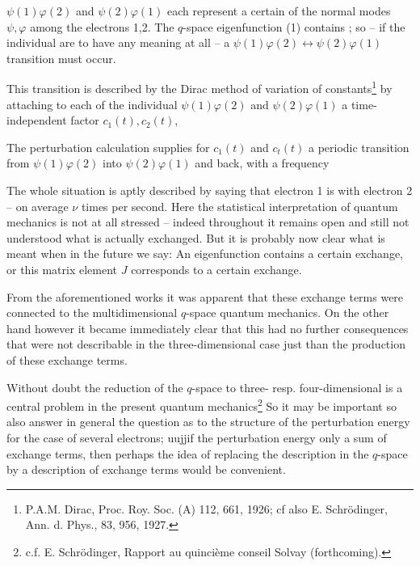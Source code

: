 \begin{paper}{1}
$\psi(1)\varphi(2)$ and $\psi(2)\varphi(1)$ each represent a certain  of the normal modes $\psi,\varphi$ among the electrons 1,2. The $q$-space eigenfunction (1) contains ; so -- if the individual  are to have any meaning at all -- a $\psi(1)\varphi(2) \longleftrightarrow \psi(2)\varphi(1)$ transition must occur.

This transition is described by the Dirac method of variation of constants\footnote{P.A.M. Dirac, Proc. Roy. Soc. (A) 112, 661, 1926; cf also E. Schr\"odinger, Ann. d. Phys., 83, 956, 1927.} by attaching to each of the individual $\psi(1)\varphi(2)$ and $\psi(2)\varphi(1)$ a time-independent factor $c_1(t),c_2(t)$,

The perturbation calculation supplies for $c_1(t)$ and $c_t(t)$ a periodic transition from $\psi(1)\varphi(2)$ into $\psi(2)\varphi(1)$ and back, with a frequency

The whole situation is aptly described by saying that electron 1 is  with electron 2 -- on average $\nu$ times per second. Here the statistical interpretation of quantum mechanics is not at all stressed -- indeed throughout it remains open and still not understood what is actually exchanged. But it is probably now clear what is meant when in the future we say: An eigenfunction contains a certain exchange, or this matrix element $J$ corresponds to a certain exchange.

From the aforementioned works it was apparent that these  exchange terms were connected to the multidimensional $q$-space quantum mechanics. On the other hand however it became immediately clear that this had no further consequences that were not describable in the three-dimensional case just than the production of these exchange terms.

Without doubt the reduction of the $q$-space to three- resp. four-dimensional  is a central problem in the present quantum mechanics\footnote{c.f. E. Schr\"odinger, Rapport au quinci\`eme conseil Solvay (forthcoming).} So it may be important so also answer in general the question as to the structure of the perturbation energy for the case of several electrons; uujjif the perturbation energy only a sum of exchange terms, then perhaps the idea of replacing the description in the $q$-space by a description of exchange terms would be convenient.


\end{paper}

